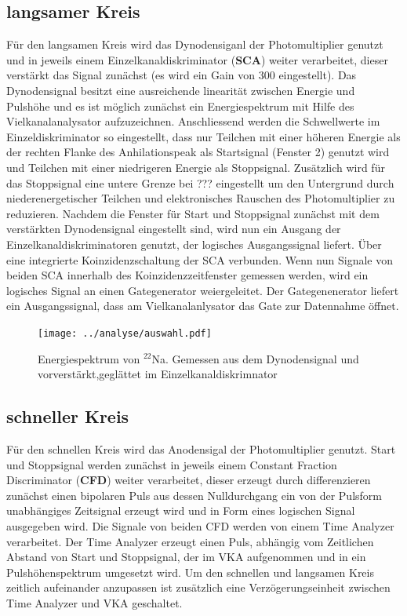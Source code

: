 \documentclass[a4paper,12pt]{article}
\begin{document}
\subsection*{langsamer Kreis}
	Für den langsamen Kreis wird das Dynodensiganl der Photomultiplier genutzt und in jeweils einem 
	Einzelkanaldiskriminator (\textbf{SCA}) weiter verarbeitet, dieser verstärkt das Signal zunächst (es wird
	ein Gain von 300 eingestellt). 
	Das Dynodensignal besitzt eine ausreichende linearität zwischen Energie und Pulshöhe und es ist möglich 
	zunächst ein Energiespektrum mit Hilfe des Vielkanalanalysator aufzuzeichnen.
	Anschliessend werden die Schwellwerte im Einzeldiskriminator so eingestellt, dass nur Teilchen mit einer höheren
	Energie als der rechten Flanke des Anhilationspeak als Startsignal (Fenster 2) genutzt wird und Teilchen
	mit einer niedrigeren Energie als Stoppsignal. Zusätzlich wird für das Stoppsignal eine untere Grenze bei ???
	eingestellt um den Untergrund durch niederenergetischer Teilchen und elektronisches Rauschen des Photomultiplier
	zu reduzieren. Nachdem die Fenster für Start und Stoppsignal zunächst mit dem verstärkten Dynodensignal eingestellt sind,
	wird nun ein Ausgang der Einzelkanaldiskriminatoren genutzt, der logisches Ausgangssignal liefert.
	Über eine integrierte Koinzidenzschaltung der SCA verbunden. Wenn nun Signale von beiden SCA innerhalb des Koinzidenzzeitfenster
	gemessen werden, wird ein logisches Signal an einen Gategenerator weiergeleitet. Der Gategenenerator liefert ein Ausgangssignal, dass
	am Vielkanalanlysator das Gate zur Datennahme öffnet.
\begin{figure}
		\texttt{[image: ../analyse/auswahl.pdf]}
		\caption{Energiespektrum von $^{22}$Na. Gemessen aus dem Dynodensignal und vorverstärkt,geglättet im Einzelkanaldiskrimnator}
		\label{fig:schaltplan}
\end{figure}


\subsection*{schneller Kreis}
	Für den schnellen Kreis wird das Anodensigal der Photomultiplier genutzt. Start und Stoppsignal werden zunächst in jeweils einem Constant
	Fraction Discriminator (\textbf{CFD}) weiter verarbeitet, dieser erzeugt durch differenzieren zunächst einen bipolaren Puls aus dessen Nulldurchgang
	ein von der Pulsform unabhängiges Zeitsignal erzeugt wird und in Form eines logischen Signal ausgegeben wird. Die Signale von beiden
	CFD werden von einem Time Analyzer verarbeitet. Der Time Analyzer erzeugt einen Puls, abhängig vom Zeitlichen Abstand von Start und Stoppsignal,
	der im VKA aufgenommen und in ein Pulshöhenspektrum umgesetzt wird. Um den schnellen und langsamen Kreis zeitlich aufeinander 
	anzupassen ist zusätzlich eine Verzögerungseinheit zwischen Time Analyzer und VKA geschaltet.
	
\end{document}

